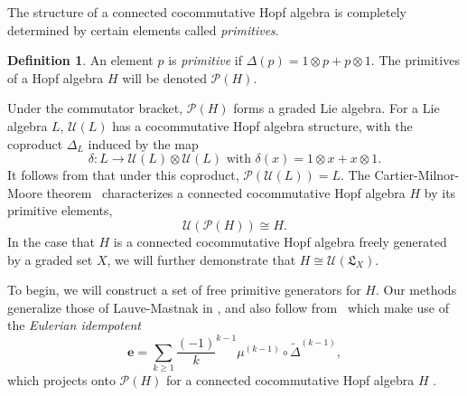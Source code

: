 \documentclass[11pt]{amsart}
\theoremstyle{definition}
\newtheorem{definition}[theorem]{Definition}
\numberwithin{equation}{section}
\begin{document}
The structure of a connected cocommutative Hopf algebra is completely determined by certain elements called \textit{primitives}.
\begin{definition}
    An element $p$ is \textit{primitive} if $\Delta(p) = 1 \otimes p + p \otimes 1$. The primitives of a Hopf algebra $H$ will be denoted $\mathcal{P}(H)$.
\end{definition}

Under the commutator bracket, $\mathcal{P}(H)$ forms a graded Lie algebra. For a Lie algebra $L$, $\mathcal{U}(L)$ has a cocommutative Hopf algebra structure, with the coproduct $\Delta_L$ induced by the map
\[
\delta :L\to \mathcal{U}(L)\otimes\mathcal{U}(L) \text{  with  }\delta(x)=1\otimes x + x\otimes 1.
\] 
It follows from \cite[Theorem 1.4]{Reutenauer-FreeLieAlgebras} that under this coproduct, $\mathcal{P}(\mathcal{U}(L))=L$.
The Cartier-Milnor-Moore theorem~\cite[see Theorem 5.18]{MM65} characterizes a connected cocommutative Hopf algebra $H$ by its primitive elements,
\[
\mathcal{U}(\mathcal{P}(H))\cong H.
\]
In the case that $H$ is a connected cocommutative Hopf algebra freely generated by a graded set $X$, 
we will further demonstrate that $H\cong \mathcal{U}(\mathfrak{L}_X).$

To begin, we will construct a set of free primitive generators for $H$.  
Our methods generalize those of Lauve-Mastnak in \cite{LM11}, and also follow from~\cite[Prop. 9.9]{S94} which make use of the \emph{Eulerian idempotent}
\[
\mathbf{e} = \sum_{k \geq 1}\frac{(-1)}{k}^{k-1} \mu^{(k-1)} \circ \tilde{\Delta}^{(k-1)},
\]
which projects onto $\mathcal{P}(H)$ for a connected cocommutative Hopf algebra $H$ \cite[Theorem 9.4]{S94}.
\end{document}
